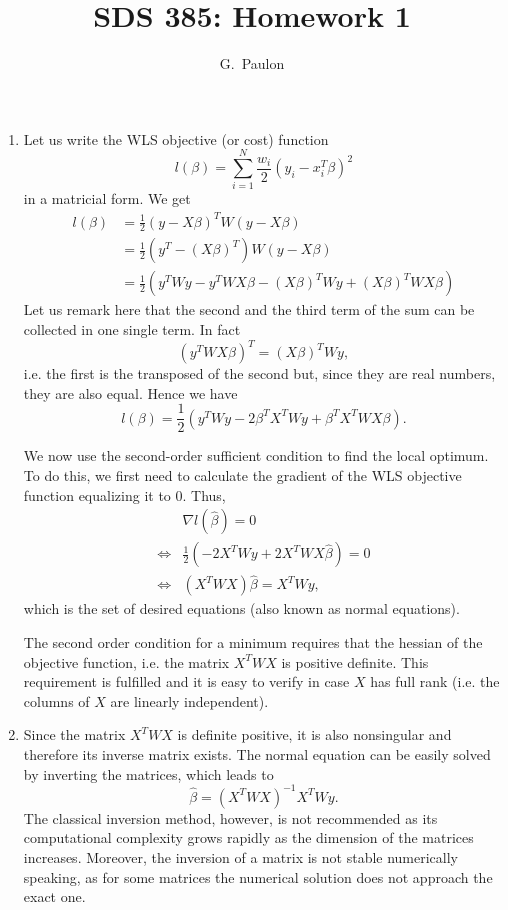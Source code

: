 \documentclass{jhwhw}
\title{SDS 385: Homework 1}
\author{G.~Paulon}
\begin{document}

\begin{enumerate}[label=(\Alph*)]
\item Let us write the WLS objective (or cost) function $$l (\beta) = \sum_{i=1}^N \frac{w_i}{2} (y_i - x_i^T \beta)^2$$ in a matricial form. We get 
\begin{align*}
l(\beta) &= \frac{1}{2} (y - X \beta)^T W (y - X \beta)
\\
&= \frac{1}{2} (y^T - (X \beta)^T) W (y - X \beta)
\\
&= \frac{1}{2} \left( y^T W y - y^T W X \beta - (X \beta)^T W y + (X \beta)^T W X \beta \right) 
\end{align*}
Let us remark here that the second and the third term of the sum can be collected in one single term. In fact 
$$(y^T W X \beta)^T = (X \beta)^T W y,$$ i.e. the first is the transposed of the second but, since they are real numbers, they are also equal. Hence we have
\begin{equation*}
l(\beta) = \frac{1}{2} \left( y^T W y - 2 \beta^T X^T W y + \beta^T X^T W X \beta \right). 
\end{equation*}

We now use the second-order sufficient condition to find the local optimum. To do this, we first need to calculate the gradient of the WLS objective function equalizing it to $0$. Thus, 
\begin{align*}
&\nabla l (\hat{\beta}) = 0
\\
\Leftrightarrow &\frac{1}{2} (- 2 X^T W y + 2 X^T W X \hat{\beta}) = 0
\\
\Leftrightarrow &(X^T W X) \hat{\beta} = X^T W y,
\end{align*}
which is the set of desired equations (also known as normal equations). 

The second order condition for a minimum requires that the hessian of the objective function, i.e. the matrix $X^T W X$ is positive definite. This requirement is fulfilled and it is easy to verify in case $X$ has full rank (i.e. the columns of $X$ are linearly independent).

\item Since the matrix $X^T W X$ is definite positive, it is also nonsingular and therefore its inverse matrix exists. The normal equation can be easily solved by inverting the matrices, which leads to
$$\hat{\beta} = (X^T W X)^{-1} X^T W y.$$
The classical inversion method, however, is not recommended as its computational complexity grows rapidly as the dimension of the matrices increases. Moreover, the inversion of a matrix is not stable numerically speaking, as for some matrices the numerical solution does not approach the exact one.


\end{enumerate}
\end{document}
